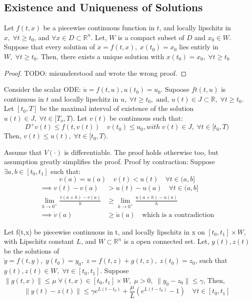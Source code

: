 \subsection{Existence and Uniqueness of Solutions}
\begin{theorem}
    Let \(f(t,x)\) be a piecewise continuous function in \(t\), and locally lipschitz in \(x, \; \forall t \geq t_0\),
    and \(\forall x \in D \subset \mathbb{R}^n\). Let, \(W\) is a compact subset of \(D\) and \(x_0 \in W\). Suppose
    that every solution of \(\dot{x} = f(t,x),\; x(t_0) = x_0\) lies entirly in \(W,\; \forall t \geq  t_0\). Then,
    there exists a unique solution with \(x(t_0) = x_0,\; \forall t \geq t_0 \)   
\end{theorem}
\begin{proof}
    TODO: misunderstood and wrote the wrong proof.
\end{proof}
\begin{lemma}
    Consider the scalar ODE: \(\dot{u} = f(t,u), u(t_0) = u_0\). Supoose \(ft(t,u)\) is continuous in \(t\) and
    locally lipschitz in \(u, \; \forall t \geq t_0, \text{ and, } u(t) \in J \subset \mathbb{R}, \; \forall t \geq t_0\).
    Let \([t_0,T]\) be the maximal interval of existence of the solution \(u(t) \in J,\; \forall t \in [T_o,T)  \).
    Let \(v(t)\) be continuous such that:
    \[
        D^+ v(t) \leq f(t,v(t)) \quad v(t_0) \leq u_0, with \; v(t) \in J, \; \forall t \in [t_0, T)
    \]
    Then, \(v(t) \leq u(t), \; \forall t \in [t_0, T)\).
\end{lemma}
\begin{lemmaproof}
    Assume that \(V(\cdot)\) is differentiable. The proof holds otherwise too, but assumption greatly simplifies
    the proof.
    Proof by contraction:
    Suppose \(\exists a,b \in [t_0,t_1]\) such that:
    \[
        v(a) = u(a) \quad v(t) < u(t) \quad \forall t \in (a,b]
    \] 
    \[
        \begin{aligned}
            \implies v(t) - v(a) &> u(t) - u(a) \quad \forall t \in (a,b]\\
            \lim_{h \to 0^+} \frac{v(a+h) - v(a)}{h} &\geq \lim_{h \to 0^+} \frac{u(a+h) - u(a)}{h} \\
            \implies \dot{v}(a) &\geq \dot{u}(a) \quad \text{which is a contradiction}            
        \end{aligned}
    \]
\end{lemmaproof}
\begin{theorem}
    Let f(t,x) be piecewise continuous in t, and locally lipschitz in x on \([t_0,t_1] \times W\), with
    Lipschitz constant \(L\), and \(W \subset \mathbb{R}^n\) is a open connected set. Let, \(y(t),z(t)\) be the solutions
    of \(\dot{y} = f(t,y),\; y(t_0) = y_0, \; \dot{z} = f(t,z) + g(t,z),\; z(t_0 ) = z_0\), such that 
    \(y(t),z(t) \in W,\; \forall t \in [t_0,t_1]\). Suppose \(\lVert g(t,x)\rVert \leq  \mu \;\forall (t,x) \in
    [t_0,t_1]\times W,\;\mu >0,\; \lVert y_0 - z_0 \rVert \leq \gamma  \), Then,
    \[
        \lVert y(t) - z(t) \rVert \leq \gamma e^{L(t-t_0)} + \frac{\mu}{L} \left( e^ {L(t-t_0)} - 1\right) 
        \quad \forall t \in [t_0,t_1]  
    \]
\end{theorem}
